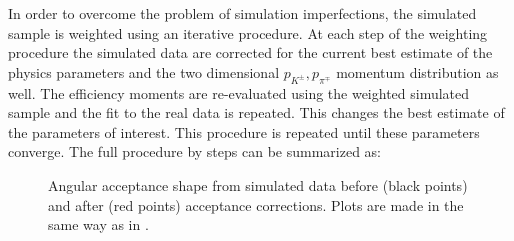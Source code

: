 In order to overcome the problem of simulation imperfections, the simulated sample is weighted using an iterative procedure.
At each step of the weighting procedure the simulated data are corrected for the current best estimate of the physics
parameters and the two dimensional $p_{K^{\pm}},p_{\pi^{\mp}}$ momentum distribution as well.
The efficiency moments are re-evaluated using the weighted simulated sample and the fit to the real data is repeated.
This changes the best estimate of the parameters of interest. This procedure is repeated until these parameters
converge. The full procedure by steps can be summarized as:

\begin{figure}[!t]
  \centering
  \begin{subfigure}{0.49\textwidth}
    \raggedright
    \scalebox{1.15}{}
    \caption{}
    \label{angAccCor_ctk}
  \end{subfigure}%
  \hfill%
  \begin{subfigure}{0.49\textwidth}
    \raggedleft
    \scalebox{1.15}{}
    \caption{}
    \label{angAccCorr_ctl}
  \end{subfigure}
  \vspace*{0.02\textwidth}
  \begin{subfigure}{0.49\textwidth}
    \raggedright
    \scalebox{1.15}{}
    \caption{}
    \label{angAccCorr_phi}
  \end{subfigure}
  \caption{Angular acceptance shape from simulated data before (black points) and after (red points) acceptance corrections.
           Plots are made in the same way as in .}
  \label{angAggCorrections}
\end{figure}


